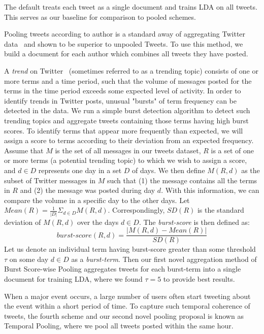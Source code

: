 \documentclass{sig-alternate}
\begin{document}
\vspace{1mm} The default treats
each tweet as a single document and trains LDA on all tweets. This
serves as our baseline for comparison to pooled schemes.

\vspace{1mm} Pooling tweets according to
author is a standard away of aggregating Twitter
data~\cite{Weng2010wsdm,hong} and shown to be superior to unpooled
Tweets.  To use this method, we build a document for each author which
combines all tweets they have posted.

\vspace{1mm} A \textit{trend} on
Twitter~\cite{mor} (sometimes referred to as a trending topic)
consists of one or more terms and a time period, such that the volume
of messages posted for the terms in the time period exceeds some
expected level of activity.  In order to identify trends in Twitter
posts, unusual "bursts" of term frequency can be detected in the data.
We run a simple burst detection algorithm to detect such trending
topics and aggregate tweets containing those terms having high burst
scores.  To identify terms that appear more frequently than expected,
we will assign a score to terms according to their deviation from an
expected frequency. Assume that $M$ is the set of all messages in our
tweets dataset, $R$ is a set of one or more terms (a potential
trending topic) to which we wish to assign a score, and $d \in D$
represents one day in a set $D$ of days.  We then define $M(R, d)$ as
the subset of Twitter messages in $M$ such that (1) the message
contains all the terms in $R$ and (2) the message was posted during
day $d$.  With this information, we can compare the volume in a
specific day to the other days.  Let $\mathit{Mean}(R) = \frac{1}{|D|}
\Sigma_{d \in D} M(R,d)$.  Correspondingly, $\mathit{SD}(R)$ is the
standard deviation of $M(R,d)$ over the days $d \in D$.  The
\textit{burst-score} is then defined as:
\[
\mathit{burst\textrm{-}score}(R,d) = \frac{|M(R,d) - \mathit{Mean}(R)|}{\mathit{SD}(R)} 
\]
Let us denote an individual term having burst-score greater than some
threshold $\tau$ on some day $d \in D$ as a \textit{burst-term}.  Then
our first novel aggregation method of Burst Score-wise Pooling
aggregates tweets for each burst-term into a single document for
training LDA, where we found $\tau = 5$ to provide best results.

\vspace{1mm} When a major event occurs, a
large number of users often start tweeting about the event within a
short period of time.  To capture such temporal coherence of tweets,
the fourth scheme and our second novel pooling proposal is known as
Temporal Pooling, where we pool all tweets posted within the same
hour.
\end{document}
